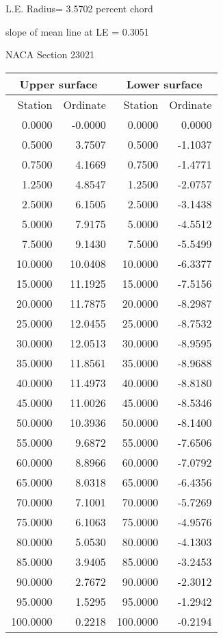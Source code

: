 \documentclass[11pt]{book}
\begin{document}
L.E. Radius=  3.5702 percent chord


 slope of mean line at LE =  0.3051
 \newpage
  \label{s23021}
 \begin{Large}
 NACA Section 23021
 \end{Large}
  
 \vspace{8mm}
 \begin{tabular}{|r|r|r|r|} \hline 
 \multicolumn{2}{|c|}{Upper surface} & \multicolumn{2}{|c|}{Lower surface} \\
 \hline
 Station & Ordinate & Station & Ordinate \\
 \hline
0.0000 & -0.0000 & 0.0000 & 0.0000 \\
0.5000 & 3.7507 & 0.5000 & -1.1037 \\
0.7500 & 4.1669 & 0.7500 & -1.4771 \\
1.2500 & 4.8547 & 1.2500 & -2.0757 \\
2.5000 & 6.1505 & 2.5000 & -3.1438 \\
5.0000 & 7.9175 & 5.0000 & -4.5512 \\
7.5000 & 9.1430 & 7.5000 & -5.5499 \\
10.0000 & 10.0408 & 10.0000 & -6.3377 \\
15.0000 & 11.1925 & 15.0000 & -7.5156 \\
20.0000 & 11.7875 & 20.0000 & -8.2987 \\
25.0000 & 12.0455 & 25.0000 & -8.7532 \\
30.0000 & 12.0513 & 30.0000 & -8.9595 \\
35.0000 & 11.8561 & 35.0000 & -8.9688 \\
40.0000 & 11.4973 & 40.0000 & -8.8180 \\
45.0000 & 11.0026 & 45.0000 & -8.5346 \\
50.0000 & 10.3936 & 50.0000 & -8.1400 \\
55.0000 & 9.6872 & 55.0000 & -7.6506 \\
60.0000 & 8.8966 & 60.0000 & -7.0792 \\
65.0000 & 8.0318 & 65.0000 & -6.4356 \\
70.0000 & 7.1001 & 70.0000 & -5.7269 \\
75.0000 & 6.1063 & 75.0000 & -4.9576 \\
80.0000 & 5.0530 & 80.0000 & -4.1303 \\
85.0000 & 3.9405 & 85.0000 & -3.2453 \\
90.0000 & 2.7672 & 90.0000 & -2.3012 \\
95.0000 & 1.5295 & 95.0000 & -1.2942 \\
100.0000 & 0.2218 & 100.0000 & -0.2194 \\
 \hline 
 \end{tabular}
\end{document}
